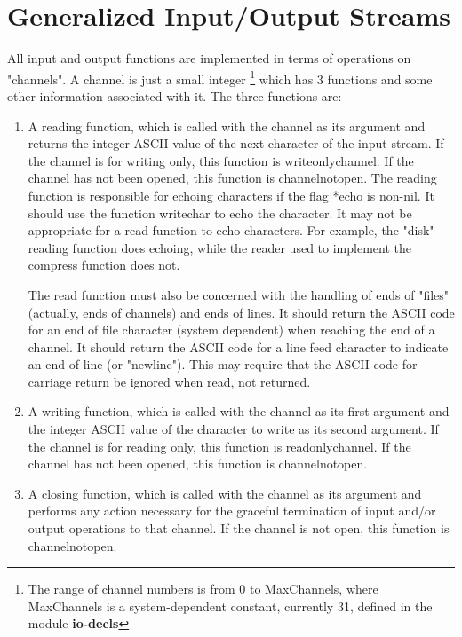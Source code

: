 \section{Generalized Input/Output Streams}

  All  input  and  output  functions are implemented in terms of
operations on "channels".  A channel is  just  a  small  integer
\footnote{ The   range   of  channel  numbers  is  from  0  to
MaxChannels, where MaxChannels is a  system-dependent  constant,
currently  31,  defined  in  the module {\bf io-decls}} which has 3
functions and some other information associated with  it.    The
three functions are:

\begin{enumerate}
\item   A  reading  function,  which is called with the channel as
     its argument and returns the integer  ASCII  value  of  the
     next  character of the input stream.  If the channel is for
     writing only, this function is writeonlychannel.    If  the
     channel   has   not   been   opened,   this   function   is
     channelnotopen.  The reading function  is  responsible  for
     echoing characters if the flag *echo is non-nil.  It should
     use  the  function writechar to echo the character.  It may
     not be appropriate for a read function to echo  characters.
     For  example,  the  "disk"  reading  function does echoing,
     while the reader used to implement  the  compress  function
     does not.

The  read function must also be concerned with the
handling of ends of "files" (actually, ends of 
channels) and ends of lines.  It should return the
ASCII code for an end of  file character (system
dependent) when reaching the end of a channel. It
should return the ASCII code for a line  feed 
character  to indicate an end of line (or "newline").
This may require that the ASCII code for carriage
return  be ignored when read, not returned.
 
\item A writing function, which is called with the channel as its
first argument and the integer ASCII value of the
character to  write  as  its  second argument.  If
the channel is for reading only, this function is
readonlychannel. If the channel has not been
opened, this function is channelnotopen.

  
\item	A closing function, which is called with the channel as its
argument and performs any action necessary for the 
graceful termination of input and/or output operations 
to that channel. If the channel is not open, this 
function is channelnotopen.
\end{enumerate}

